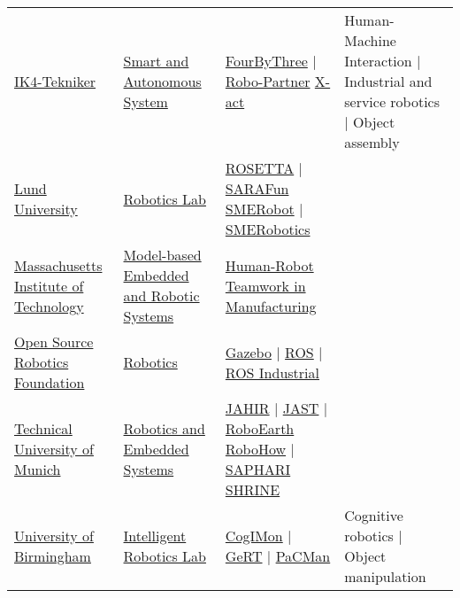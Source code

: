 \begin{table}[H]
\begin{tabu} { X[m,c] X[0.9,m,c] X[1.2,m,c] X[1.8,m,c] }
		\tabucline[1pt on 1.5pt off 3pt]{-}
		\href{http://www.tekniker.es/en}{IK4-Tekniker} &
		\href{http://www.tekniker.es/en/automation-and-industrial-robotics}{Smart and Autonomous System} &
		\href{http://fourbythree.eu/}{FourByThree} | \href{http://www.robo-partner.eu}{Robo-Partner} \href{http://www.xact-project.eu}{X-act} &
		Human-Machine Interaction | Industrial and service robotics | Object assembly \\

		\tabucline[1pt on 1.5pt off 3pt]{-}
		\href{http://www.lunduniversity.lu.se/}{Lund University} &
		\href{http://www.control.lth.se/Research/Robotics.html}{Robotics Lab} &
		\href{http://www.fp7rosetta.org}{ROSETTA} | \href{http://h2020sarafun.eu}{SARAFun} \href{http://www.smerobot.org}{SMERobot} | \href{http://www.smerobotics.org/AUTOMATICA/exhibit-09-2016.html}{SMERobotics} &
		\\

		\tabucline[1pt on 1.5pt off 3pt]{-}
		\href{http://web.mit.edu/}{Massachusetts Institute of Technology} &
		\href{http://groups.csail.mit.edu/mers}{Model-based Embedded and Robotic Systems} &
		\href{http://groups.csail.mit.edu/mers/projects/human-robot-teamwork-in-manufacturing}{Human-Robot Teamwork in Manufacturing} &
		\\

		\tabucline[1pt on 1.5pt off 3pt]{-}
		\href{http://www.osrfoundation.org}{Open Source Robotics Foundation} &
		\href{http://www.osrfoundation.org/osrf-projects/}{Robotics} &
		\href{http://gazebosim.org/}{Gazebo} | \href{http://www.ros.org/}{ROS} | \href{http://rosindustrial.org/}{ROS Industrial} &
		\\

		\tabucline[1pt on 1.5pt off 3pt]{-}
		\href{http://www.tum.de/en}{Technical University of Munich} &
		\href{http://www6.in.tum.de/Main/Research}{Robotics and Embedded Systems} &
		\href{http://www6.in.tum.de/Main/ResearchJahir}{JAHIR} | \href{http://www6.in.tum.de/Main/ResearchJast}{JAST} | \href{http://roboearth.org/}{RoboEarth} \href{https://robohow.eu}{RoboHow} | \href{http://www.saphari.eu}{SAPHARI} \href{http://www.shrine-project.eu}{SHRINE} &
		\\

		\tabucline[1pt on 1.5pt off 3pt]{-}
		\href{http://www.birmingham.ac.uk}{University of Birmingham} &
		\href{https://www.cs.bham.ac.uk/research/groupings/robotics/}{Intelligent Robotics Lab} &
		\href{https://cogimon.eu}{CogIMon} | \href{https://www.cs.bham.ac.uk/~rwd/research/gert-main.php}{GeRT} | \href{http://www.pacman-project.eu/}{PaCMan} &
		Cognitive robotics | Object manipulation \\


\end{tabu}
\end{table}
